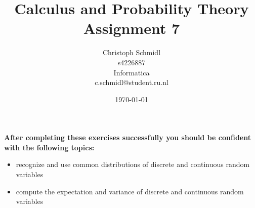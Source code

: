 \documentclass[a4paper]{article}
\title{Calculus and Probability Theory\\ Assignment 7}
\author{Christoph Schmidl\\
s4226887\\
Informatica\\
c.schmidl@student.ru.nl\\}
\date{\today}
\begin{document}
\maketitle





\textbf{After completing these exercises successfully you should be confident with the following topics:}

\begin{itemize}
	\item recognize and use common distributions of discrete and continuous random variables
	\item compute the expectation and variance of discrete and continuous random variables
\end{itemize}
\vspace{1em}
\end{document}
